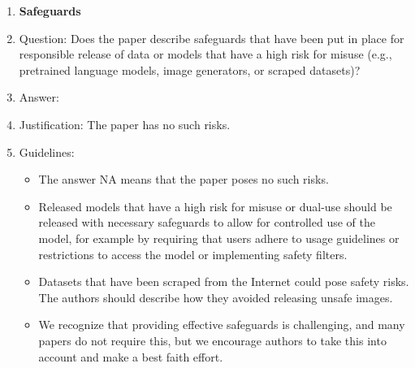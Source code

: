\documentclass{article}
\begin{document}
\begin{enumerate}
\item {\bf Safeguards}
    \item[] Question: Does the paper describe safeguards that have been put in place for responsible release of data or models that have a high risk for misuse (e.g., pretrained language models, image generators, or scraped datasets)?
    \item[] Answer: \answerNA{} %
    \item[] Justification: The paper has no such risks.
    \item[] Guidelines:
    \begin{itemize}
        \item The answer NA means that the paper poses no such risks.
        \item Released models that have a high risk for misuse or dual-use should be released with necessary safeguards to allow for controlled use of the model, for example by requiring that users adhere to usage guidelines or restrictions to access the model or implementing safety filters. 
        \item Datasets that have been scraped from the Internet could pose safety risks. The authors should describe how they avoided releasing unsafe images.
        \item We recognize that providing effective safeguards is challenging, and many papers do not require this, but we encourage authors to take this into account and make a best faith effort.
    \end{itemize}


\end{enumerate}
\end{document}
